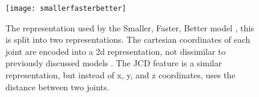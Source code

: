 \begin{figure}[h]
	\texttt{[image: smallerfasterbetter]}
	\centering
	\caption{The representation used by the Smaller, Faster, Better model \cite{smaller_faster_better}, this is split into two representations. The cartesian coordinates of each joint are encoded into a 2d representation, not dissimilar to previously discussed models \cite{simple_yet_efficient}. The JCD feature is a similar representation, but instead of x, y, and z coordinates, uses the distance between two joints.}
	\label{fig:smallerfasterbetter}
\end{figure}